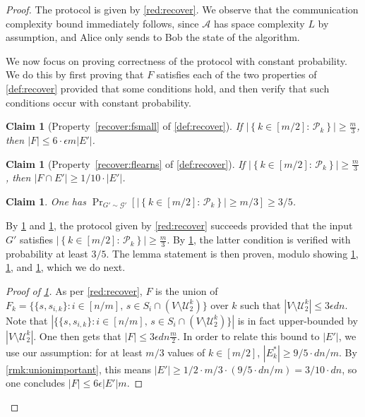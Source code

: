 \documentclass[epsfig,letter,11pt]{article}
\numberwithin{equation}{section}
\newtheorem{claim}[theorem]{Claim}
\begin{document}
\begin{proof}
	The protocol is given by \cref{red:recover}.  We observe that the communication complexity bound immediately follows, since $\mathcal{A}$ has space complexity $L$ by assumption, and Alice only sends to Bob the state of the algorithm.
	
	We now focus on proving correctness of the protocol with constant probability. We do this by first proving that $F$ satisfies each of the two properties of \cref{def:recover} provided that some conditions hold, and then verify that such conditions occur with constant probability.
	
	\begin{claim}[Property~\eqref{recover:fsmall} of \cref{def:recover}]
		\label{claim:deterministic1}
		If $\left|\left\{k \in [m/2]: \, \mathcal{P}_k\right\} \right| \ge\frac{m}{3}$, then $|F| \le 6 \cdot \epsilon m |E'| $.
	\end{claim}

	\begin{claim}[Property~\eqref{recover:flearns} of \cref{def:recover}]
		\label{claim:deterministic2}
		If $\left|\left\{k \in [m/2]: \, \mathcal{P}_k\right\} \right| \ge\frac{m}{3}$, then $|F \cap E'| \ge 1/10 \cdot |E'|$.
	\end{claim}
	
	\begin{claim}
		\label{claim:manypks}
		One has $
			\Pr_{G' \sim \mathcal{G}'}\left[\left|\left\{k \in [m/2]: \, \mathcal{P}_k\right\} \right| \ge {m}/{3}\right] \ge {3}/{5}$.
	\end{claim}
	\noindent
	By \cref{claim:deterministic1} and \cref{claim:deterministic2}, the protocol given by \cref{red:recover} succeeds provided that the input $G'$ satisfies $\left|\left\{k \in [m/2]: \, \mathcal{P}_k\right\} \right| \ge\frac{m}{3}$. By \cref{claim:manypks}, the latter condition is verified with probability at least $3/5$. The lemma statement is then proven, modulo showing \cref{claim:deterministic1}, \cref{claim:deterministic1}, and \cref{claim:manypks}, which we do next.
	
		\begin{proof}[Proof of \cref{claim:deterministic1}]
		As per \cref{red:recover}, $F$ is the union of $F_k=\{ \{s,s_{i,k}\} : i \in [n/m],\, s \in S_i \cap (V \setminus \mathcal{U}_2^k) \}$ over $k$ such that $|V \setminus \mathcal{U}_2^k| \le 3\epsilon dn$. Note that $|\{ \{s,s_{i,k}\} : i \in [n/m],\, s \in S_i \cap (V \setminus \mathcal{U}_2^k) \}|$ is in fact upper-bounded by $|V \setminus \mathcal{U}_2^k|$. One then gets that $|F| \le 3\epsilon dn \frac{m}{2}$. In order to relate this bound to $|E'|$, we use our assumption: for at least $m/3$ values of $k \in [m/2]$, $|E^*_k| \ge 9/5 \cdot dn/m$. By \cref{rmk:unionimportant}, this means $|E'| \ge 1/2 \cdot m/3 \cdot (9/5 \cdot dn/m) = 3/10 \cdot dn$, so one concludes $|F| \le 6 \epsilon |E'| m$.
	\end{proof}
	

\end{proof}
\end{document}
